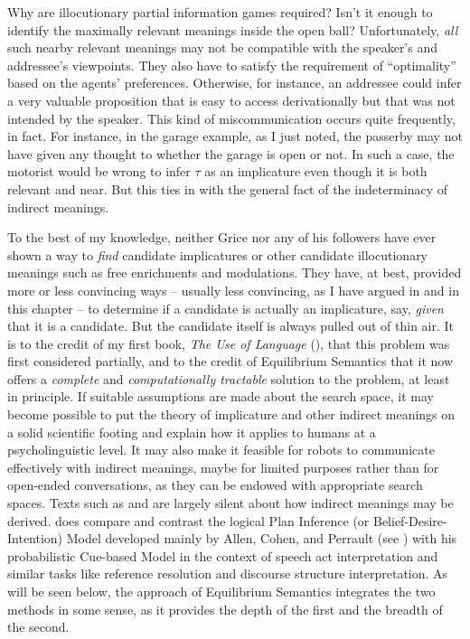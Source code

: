 Why are illocutionary partial information games required? Isn't it enough to identify the maximally relevant meanings inside the open ball? Unfortunately, \emph{all} such nearby relevant meanings may not be compatible with the speaker's and addressee's viewpoints. They also have to satisfy the requirement of ``optimality'' based on the agents' preferences. Otherwise, for instance, an addressee could infer a very valuable proposition that is easy to access derivationally but that was not intended by the speaker. This kind of miscommunication occurs quite frequently, in fact. For instance, in the garage example, as I just noted, the passerby may not have given any thought to whether the garage is open or not. In such a case, the motorist would be wrong to infer $\tau$ as an implicature even though it is both relevant and near. But this ties in with the general fact of the indeterminacy of indirect meanings.


To the best of my knowledge, neither Grice nor any of his followers have ever shown a way to \emph{find} candidate implicatures or other candidate illocutionary meanings such as free enrichments and modulations. They have, at best, provided more or less convincing ways -- usually less convincing, as I have argued in  and in this chapter -- to determine if a candidate is actually an implicature, say, \emph{given} that it is a candidate. But the candidate itself is always pulled out of thin air. It is to the credit of my first book, \emph{The Use of Language} (\citeyear[Chapter~7]{parikh:ul}), that this problem was first considered partially, and to the credit of Equilibrium Semantics that it now offers a \emph{complete} and \emph{computationally tractable} solution to the problem, at least in principle. If suitable assumptions are made about the search space, it may become possible to put the theory of implicature and other indirect meanings on a solid scientific footing and explain how it applies to humans at a psycholinguistic level. It may also make it feasible for robots to communicate effectively with indirect meanings, maybe for limited purposes rather than for open-ended conversations, as they can be endowed with appropriate search spaces. Texts such as \citet{ms:fsnlp} and \citet{jm:slp, jm:slp2} are largely silent about how indirect meanings may be derived. \citet{jurafsky:pcl} does compare and contrast the logical Plan Inference (or Belief-Desire-Intention) Model developed mainly by Allen, Cohen, and Perrault (see \citealt{allen:nlu}) with his probabilistic Cue-based Model in the context of speech act interpretation and similar tasks like reference resolution and discourse structure interpretation. As will be seen below, the approach of Equilibrium Semantics integrates the two methods in some sense, as it provides the depth of the first and the breadth of the second. 

